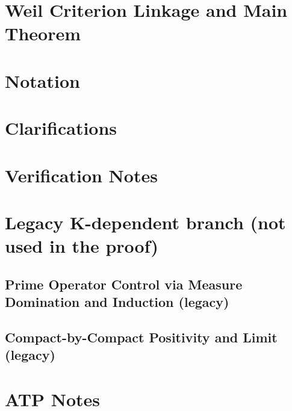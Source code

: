 \documentclass[11pt]{article}
\begin{document}
\section{Weil Criterion Linkage and Main Theorem}\label{sec:Weil}




\appendix
\section{Notation}\label{app:notation}


\section{Clarifications}\label{app:faq}


\section{Verification Notes}\label{app:verification}






\section{Legacy K-dependent branch (not used in the proof)}\label{app:legacy-branch}

\subsection{Prime Operator Control via Measure Domination and Induction (legacy)}\label{app:legacy-ind}







\subsection{Compact-by-Compact Positivity and Limit (legacy)}\label{app:legacy-t5}




\section{ATP Notes}\label{subsec:t5-atp}





\end{document}
